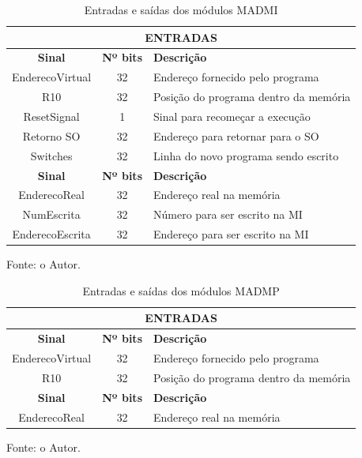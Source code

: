 \documentclass[
	12pt,				%
	oneside,
	a4paper,			%
	english,			%
	french,				%
	spanish,			%
	brazil,				%
	]{abntex2}
\begin{document}
\setlength{\tabcolsep}{10pt} %
\begin{table}[H]
\centering
\caption{Entradas e saídas dos módulos MADMI}
\label{tab:IO_MADMI}
\begin{tabular}{|c|c|l|}
\hline
\multicolumn{3}{|c|}{\textbf{ENTRADAS}} \\
\hline
\textbf{Sinal} & \textbf{Nº bits} & \textbf{Descrição} \\
\hline
EnderecoVirtual & 32 & Endereço fornecido pelo programa \\
\hline
R10 & 32 & Posição do programa dentro da memória \\
\hline
ResetSignal & 1 & Sinal para recomeçar a execução \\
\hline
Retorno SO & 32 & Endereço para retornar para o SO \\
\hline
Switches & 32 & Linha do novo programa sendo escrito \\
\hline
\textbf{Sinal} & \textbf{Nº bits} & \textbf{Descrição} \\
\hline
EnderecoReal & 32 & Endereço real na memória \\
\hline
NumEscrita & 32 & Número para ser escrito na MI \\
\hline
EnderecoEscrita & 32 & Endereço para ser escrito na MI \\
\hline
\end{tabular}
\vspace{-0.5em}
\begin{center}
Fonte: o Autor.
\end{center}
\end{table} 

\setlength{\tabcolsep}{10pt} %
\begin{table}[H]
\centering
\caption{Entradas e saídas dos módulos MADMP}
\label{tab:IO_MADMP}
\begin{tabular}{|c|c|l|}
\hline
\multicolumn{3}{|c|}{\textbf{ENTRADAS}} \\
\hline
\textbf{Sinal} & \textbf{Nº bits} & \textbf{Descrição} \\
\hline
EnderecoVirtual & 32 & Endereço fornecido pelo programa \\
\hline
R10 & 32 & Posição do programa dentro da memória \\
\hline
\textbf{Sinal} & \textbf{Nº bits} & \textbf{Descrição} \\
\hline
EnderecoReal & 32 & Endereço real na memória \\
\hline
\end{tabular}
\vspace{-0.5em}
\begin{center}
Fonte: o Autor.
\end{center}
\end{table} 
\end{document}
